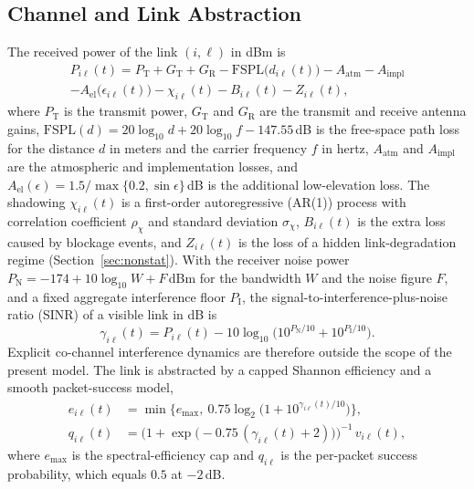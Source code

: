 \documentclass[journal]{IEEEtran}
\begin{document}
\subsection{Channel and Link Abstraction}

The received power of the link $(i,\ell)$ in dBm is
\begin{multline}
P_{i\ell}(t) = P_{\mathrm{T}} + G_{\mathrm{T}} + G_{\mathrm{R}}
 - \mathrm{FSPL}\big(d_{i\ell}(t)\big) - A_{\mathrm{atm}} - A_{\mathrm{impl}} \\
 - A_{\mathrm{el}}\big(\epsilon_{i\ell}(t)\big) - \chi_{i\ell}(t) - B_{i\ell}(t) - Z_{i\ell}(t),
\label{eq:rx}
\end{multline}
where $P_{\mathrm{T}}$ is the transmit power, $G_{\mathrm{T}}$ and
$G_{\mathrm{R}}$ are the transmit and receive antenna gains,
$\mathrm{FSPL}(d)=20\log_{10}d+20\log_{10}f-147.55$\,dB is the free-space
path loss for the distance $d$ in meters and the carrier frequency $f$ in
hertz, $A_{\mathrm{atm}}$ and $A_{\mathrm{impl}}$ are the atmospheric and
implementation losses, and
$A_{\mathrm{el}}(\epsilon)=1.5/\max\{0.2,\sin\epsilon\}$\,dB is the
additional low-elevation loss. The shadowing $\chi_{i\ell}(t)$ is a
first-order autoregressive (AR(1)) process with correlation coefficient
$\rho_\chi$ and standard deviation $\sigma_\chi$, $B_{i\ell}(t)$ is the extra
loss caused by blockage events, and $Z_{i\ell}(t)$ is the loss of a hidden
link-degradation regime (Section~\ref{sec:nonstat}). With the receiver noise
power $P_{\mathrm{N}}=-174+10\log_{10}W+F$\,dBm for the bandwidth $W$ and the
noise figure $F$, and a fixed aggregate interference floor $P_{\mathrm{I}}$,
the signal-to-interference-plus-noise ratio (SINR) of a visible link in dB is
\begin{equation}
\gamma_{i\ell}(t)=P_{i\ell}(t)-10\log_{10}\!\big(10^{P_{\mathrm{N}}/10}+10^{P_{\mathrm{I}}/10}\big).
\label{eq:sinr}
\end{equation}
Explicit co-channel interference dynamics are therefore outside the scope of
the present model. The link is abstracted by a capped Shannon efficiency and
a smooth packet-success model,
\begin{align}
e_{i\ell}(t) &= \min\big\{e_{\max},\ 0.75\log_2\!\big(1+10^{\gamma_{i\ell}(t)/10}\big)\big\},\\
q_{i\ell}(t) &= \Big(1+\exp\!\big(-0.75\,(\gamma_{i\ell}(t)+2)\big)\Big)^{-1}\,v_{i\ell}(t),
\label{eq:bler}
\end{align}
where $e_{\max}$ is the spectral-efficiency cap and $q_{i\ell}$ is the
per-packet success probability, which equals $0.5$ at $-2$\,dB.
\end{document}
